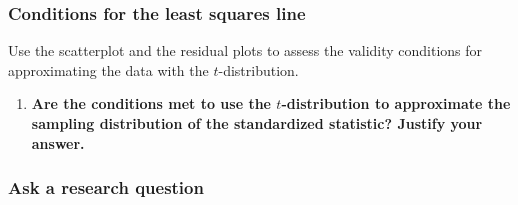 \documentclass[
]{report}
\newenvironment{Shaded}{\begin{snugshade}}{\end{snugshade}}
\newcommand{\AttributeTok}[1]{\textcolor[rgb]{0.77,0.63,0.00}{#1}}
\newcommand{\CommentTok}[1]{\textcolor[rgb]{0.56,0.35,0.01}{\textit{#1}}}
\newcommand{\DecValTok}[1]{\textcolor[rgb]{0.00,0.00,0.81}{#1}}
\newcommand{\FunctionTok}[1]{\textcolor[rgb]{0.00,0.00,0.00}{#1}}
\newcommand{\NormalTok}[1]{#1}
\newcommand{\OtherTok}[1]{\textcolor[rgb]{0.56,0.35,0.01}{#1}}
\newcommand{\SpecialCharTok}[1]{\textcolor[rgb]{0.00,0.00,0.00}{#1}}
\newcommand{\StringTok}[1]{\textcolor[rgb]{0.31,0.60,0.02}{#1}}
\providecommand{\tightlist}{%
  \setlength{\itemsep}{0pt}\setlength{\parskip}{0pt}}
\begin{document}
\hypertarget{conditions-for-the-least-squares-line-1}{%
\subsubsection*{Conditions for the least squares line}\label{conditions-for-the-least-squares-line-1}}

Use the scatterplot and the residual plots to assess the validity conditions for approximating the data with the \(t\)-distribution.

\begin{Shaded}
\end{Shaded}

\begin{enumerate}
\def\labelenumi{\arabic{enumi}.}
\setcounter{enumi}{5}
\tightlist
\item
  \textbf{Are the conditions met to use the \(t\)-distribution to approximate the sampling distribution of the standardized statistic? Justify your answer.}
\end{enumerate}

\vspace{1.5in}

\hypertarget{ask-a-research-question-7}{%
\subsubsection*{Ask a research question}\label{ask-a-research-question-7}}
\end{document}
